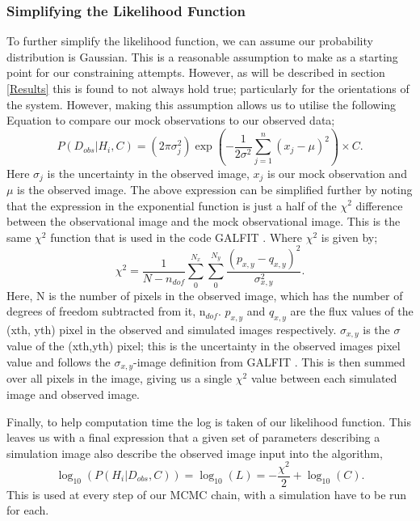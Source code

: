 \subsubsection{Simplifying the Likelihood Function}
To further simplify the likelihood function, we can assume our probability distribution is Gaussian. This is a reasonable assumption to make as a starting point for our constraining attempts. However, as will be described in section \ref{Results} this is found to not always hold true; particularly for the orientations of the system. However, making this assumption allows us to utilise the following Equation to compare our mock observations to our observed data;
\begin{equation}\label{like_gauss}
    P(D_{obs}|H_{i},C) = (2\pi\sigma^{2}_{j})\exp(-\frac{1}{2\sigma^{2}}\sum_{j=1}^{n}(x_{j}-\mu)^{2}) \times C.
\end{equation}
Here $\sigma_{j}$ is the uncertainty in the observed image, $x_{j}$ is our mock observation and $\mu$ is the observed image. The above expression can be simplified further by noting that the expression in the exponential function is just a half of the $\chi^{2}$ difference between the observational image and the mock observational image. This is the same $\chi^{2}$ function that is used in the code GALFIT \citep{2002AJ....124..266P}. Where $\chi^{2}$ is given by;
\begin{equation}\label{chi_squared}
    \chi^{2} = \frac{1}{N - n_{dof}}\sum_{0}^{N_{x}}\sum_{0}^{N_{y}}\frac{(p_{x,y} - q_{x,y})^{2}}{\sigma_{x,y}^{2}}.
\end{equation}
Here, N is the number of pixels in the observed image, which has the number of degrees of freedom subtracted from it, n$_{dof}$. $p_{x,y}$ and $q_{x,y}$ are the flux values of the (xth, yth) pixel in the observed and simulated images respectively. $\sigma_{x,y}$ is the $\sigma$ value of the (xth,yth) pixel; this is the uncertainty in the observed images pixel value and follows the $\sigma_{x,y}$-image definition from GALFIT \citep{2002AJ....124..266P,2010AJ....139.2097P}. This is then summed over all pixels in the image, giving us a single $\chi^{2}$ value between each simulated image and observed image.

Finally, to help computation time the log is taken of our likelihood function. This leaves us with a final expression that a given set of parameters describing a simulation image also describe the observed image input into the algorithm,
\begin{equation}\label{likelihood}
    \log_{10}(P(H_{i}|D_{obs},C)) = \log_{10}(L) = - \frac{\chi^{2}}{2} + \log_{10}(C).
\end{equation}
This is used at every step of our MCMC chain, with a simulation have to be run for each.

